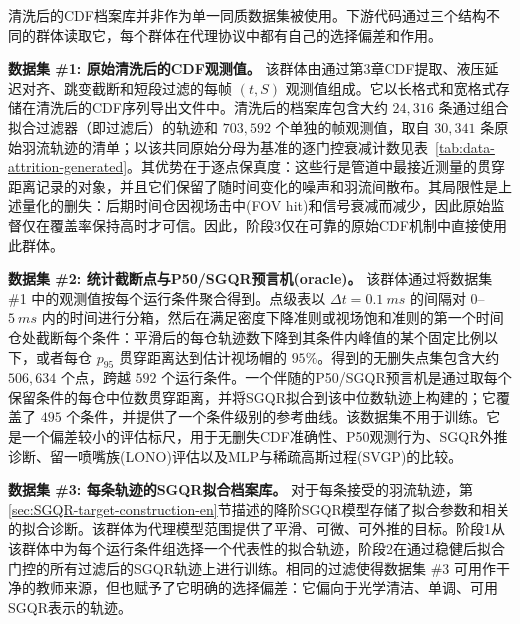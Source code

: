 清洗后的CDF档案库并非作为单一同质数据集被使用。下游代码通过三个结构不同的群体读取它，每个群体在代理协议中都有自己的选择偏差和作用。

\textbf{数据集 \#1: 原始清洗后的CDF观测值。}
该群体由通过第3章CDF提取、液压延迟对齐、跳变截断和短段过滤的每帧 \((t,S)\) 观测值组成。它以长格式和宽格式存储在清洗后的CDF序列导出文件中。清洗后的档案库包含大约 \(24{,}316\) 条通过组合拟合过滤器（即过滤后）的轨迹和 \(703{,}592\) 个单独的帧观测值，取自 \(30{,}341\) 条原始羽流轨迹的清单；以该共同原始分母为基准的逐门控衰减计数见表~\ref{tab:data-attrition-generated}。其优势在于逐点保真度：这些行是管道中最接近测量的贯穿距离记录的对象，并且它们保留了随时间变化的噪声和羽流间散布。其局限性是上述量化的删失：后期时间仓因视场击中(FOV hit)和信号衰减而减少，因此原始监督仅在覆盖率保持高时才可信。因此，阶段3仅在可靠的原始CDF机制中直接使用此群体。

\textbf{数据集 \#2: 统计截断点与P50/SGQR预言机(oracle)。}
该群体通过将数据集 \#1 中的观测值按每个运行条件聚合得到。点级表以 \(\Delta t=\SI{0.1}{ms}\) 的间隔对 \(0\)--\(\SI{5}{ms}\) 内的时间进行分箱，然后在满足密度下降准则或视场饱和准则的第一个时间仓处截断每个条件：平滑后的每仓轨迹数下降到其条件内峰值的某个固定比例以下，或者每仓 \(p_{95}\) 贯穿距离达到估计视场帽的 \(95\%\)。得到的无删失点集包含大约 \(506{,}634\) 个点，跨越 \(592\) 个运行条件。一个伴随的P50/SGQR预言机是通过取每个保留条件的每仓中位数贯穿距离，并将SGQR拟合到该中位数轨迹上构建的；它覆盖了 \(495\) 个条件，并提供了一个条件级别的参考曲线。该数据集不用于训练。它是一个偏差较小的评估标尺，用于无删失CDF准确性、P50观测行为、SGQR外推诊断、留一喷嘴族(LONO)评估以及MLP与稀疏高斯过程(SVGP)的比较。

\textbf{数据集 \#3: 每条轨迹的SGQR拟合档案库。}
对于每条接受的羽流轨迹，第\ref{sec:SGQR-target-construction-en}节描述的降阶SGQR模型存储了拟合参数和相关的拟合诊断。该群体为代理模型范围提供了平滑、可微、可外推的目标。阶段1从该群体中为每个运行条件组选择一个代表性的拟合轨迹，阶段2在通过稳健后拟合门控的所有过滤后的SGQR轨迹上进行训练。相同的过滤使得数据集 \#3 可用作干净的教师来源，但也赋予了它明确的选择偏差：它偏向于光学清洁、单调、可用SGQR表示的轨迹。

